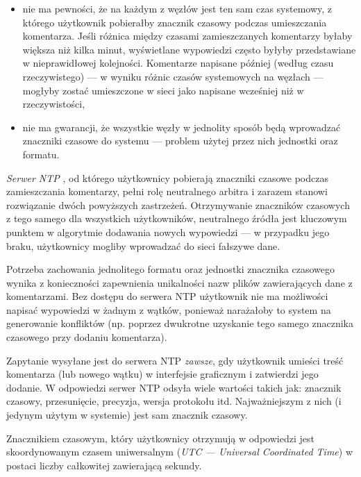 \begin{itemize}[noitemsep]
  \item nie ma pewności, że na każdym z węzłów jest ten sam czas systemowy, z którego użytkownik pobierałby znacznik czasowy podczas umieszczania komentarza. Jeśli różnica między czasami zamieszczanych komentarzy byłaby większa niż kilka minut, wyświetlane wypowiedzi często byłyby przedstawiane w nieprawidłowej kolejności. Komentarze napisane później (według czasu rzeczywistego) --- w wyniku różnic czasów systemowych na węzłach --- mogłyby zostać umieszczone w sieci jako napisane wcześniej niż w rzeczywistości,
  
  \item nie ma gwarancji, że wszystkie węzły w jednolity sposób będą wprowadzać znaczniki czasowe do systemu --- problem użytej przez nich jednostki oraz formatu.
\end{itemize}

\emph{Serwer NTP} \cite{ntp}, od którego użytkownicy pobierają znaczniki czasowe podczas zamieszczania komentarzy, pełni rolę neutralnego arbitra i zarazem stanowi rozwiązanie dwóch powyższych zastrzeżeń. Otrzymywanie znaczników czasowych z tego samego dla wszystkich użytkowników, neutralnego źródła jest kluczowym punktem w algorytmie dodawania nowych wypowiedzi --- w przypadku jego braku, użytkownicy mogliby wprowadzać do sieci fałszywe dane.

Potrzeba zachowania jednolitego formatu oraz jednostki znacznika czasowego wynika z konieczności zapewnienia unikalności nazw plików zawierających dane z komentarzami. Bez dostępu do serwera NTP użytkownik nie ma możliwości napisać wypowiedzi w żadnym z wątków, ponieważ narażałoby to system na generowanie konfliktów (np. poprzez dwukrotne uzyskanie tego samego znacznika czasowego przy dodaniu komentarza).

Zapytanie wysyłane jest do serwera NTP \emph{zawsze}, gdy użytkownik umieści treść komentarza (lub nowego wątku) w interfejsie graficznym i zatwierdzi jego dodanie. W odpowiedzi serwer NTP odsyła wiele wartości takich jak: znacznik czasowy, przesunięcie, precyzja, wersja protokołu itd. Najważniejszym z nich (i jedynym użytym w systemie) jest sam znacznik czasowy.

Znacznikiem czasowym, który użytkownicy otrzymują w odpowiedzi jest skoordynowanym czasem uniwersalnym (\emph{UTC --- Universal Coordinated Time}) w postaci liczby całkowitej zawierającą sekundy.
